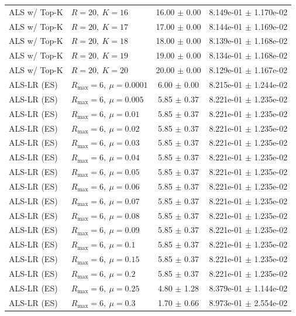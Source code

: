 \begin{table}[t]
\begin{tabular}{@{}llcc@{}}
ALS w/ Top-K & \(R=20,\ K=16\) & 16.00 $\pm$ 0.00 & 8.149e-01 $\pm$ 1.170e-02 \\
ALS w/ Top-K & \(R=20,\ K=17\) & 17.00 $\pm$ 0.00 & 8.144e-01 $\pm$ 1.169e-02 \\
ALS w/ Top-K & \(R=20,\ K=18\) & 18.00 $\pm$ 0.00 & 8.139e-01 $\pm$ 1.168e-02 \\
ALS w/ Top-K & \(R=20,\ K=19\) & 19.00 $\pm$ 0.00 & 8.134e-01 $\pm$ 1.168e-02 \\
ALS w/ Top-K & \(R=20,\ K=20\) & 20.00 $\pm$ 0.00 & 8.129e-01 $\pm$ 1.167e-02 \\
ALS-LR (ES) & \(R_{\max}=6,\ \mu=0.0001\) & 6.00 $\pm$ 0.00 & 8.215e-01 $\pm$ 1.244e-02 \\
ALS-LR (ES) & \(R_{\max}=6,\ \mu=0.005\) & 5.85 $\pm$ 0.37 & 8.221e-01 $\pm$ 1.235e-02 \\
ALS-LR (ES) & \(R_{\max}=6,\ \mu=0.01\) & 5.85 $\pm$ 0.37 & 8.221e-01 $\pm$ 1.235e-02 \\
ALS-LR (ES) & \(R_{\max}=6,\ \mu=0.02\) & 5.85 $\pm$ 0.37 & 8.221e-01 $\pm$ 1.235e-02 \\
ALS-LR (ES) & \(R_{\max}=6,\ \mu=0.03\) & 5.85 $\pm$ 0.37 & 8.221e-01 $\pm$ 1.235e-02 \\
ALS-LR (ES) & \(R_{\max}=6,\ \mu=0.04\) & 5.85 $\pm$ 0.37 & 8.221e-01 $\pm$ 1.235e-02 \\
ALS-LR (ES) & \(R_{\max}=6,\ \mu=0.05\) & 5.85 $\pm$ 0.37 & 8.221e-01 $\pm$ 1.235e-02 \\
ALS-LR (ES) & \(R_{\max}=6,\ \mu=0.06\) & 5.85 $\pm$ 0.37 & 8.221e-01 $\pm$ 1.235e-02 \\
ALS-LR (ES) & \(R_{\max}=6,\ \mu=0.07\) & 5.85 $\pm$ 0.37 & 8.221e-01 $\pm$ 1.235e-02 \\
ALS-LR (ES) & \(R_{\max}=6,\ \mu=0.08\) & 5.85 $\pm$ 0.37 & 8.221e-01 $\pm$ 1.235e-02 \\
ALS-LR (ES) & \(R_{\max}=6,\ \mu=0.09\) & 5.85 $\pm$ 0.37 & 8.221e-01 $\pm$ 1.235e-02 \\
ALS-LR (ES) & \(R_{\max}=6,\ \mu=0.1\) & 5.85 $\pm$ 0.37 & 8.221e-01 $\pm$ 1.235e-02 \\
ALS-LR (ES) & \(R_{\max}=6,\ \mu=0.15\) & 5.85 $\pm$ 0.37 & 8.221e-01 $\pm$ 1.235e-02 \\
ALS-LR (ES) & \(R_{\max}=6,\ \mu=0.2\) & 5.85 $\pm$ 0.37 & 8.221e-01 $\pm$ 1.235e-02 \\
ALS-LR (ES) & \(R_{\max}=6,\ \mu=0.25\) & 4.80 $\pm$ 1.28 & 8.379e-01 $\pm$ 1.144e-02 \\
ALS-LR (ES) & \(R_{\max}=6,\ \mu=0.3\) & 1.70 $\pm$ 0.66 & 8.973e-01 $\pm$ 2.554e-02 \\

\end{tabular}
\end{table}
